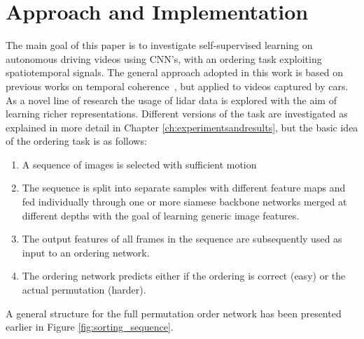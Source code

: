 %
\newpage
\chapter{Approach and Implementation}
\label{ch:approach_implementation}
The main goal of this paper is to investigate self-supervised learning on autonomous driving videos using CNN's, with an ordering task exploiting spatiotemporal signals. The general approach adopted in this work is based on previous works on temporal coherence~\cite{misra2016,lee2017}, but applied to videos captured by cars. As a novel line of research the usage of lidar data is explored with the aim of learning richer representations. Different versions of the task are investigated as explained in more detail in Chapter \ref{ch:experimentsandresults}, but the basic idea of the ordering task is as follows:
\begin{enumerate}    
\item A sequence of images is selected with sufficient motion
\item The sequence is split into separate samples with different feature maps and fed individually through one or more siamese backbone networks merged at different depths with the goal of learning generic image features.
\item The output features of all frames in the sequence are subsequently used as input to an ordering network.
\item The ordering network predicts either if the ordering is correct (easy)\cite{misra2016} or the actual permutation (harder)\cite{lee2017}.
\end{enumerate}
A general structure for the full permutation order network has been presented earlier in Figure \ref{fig:sorting_sequence}.

